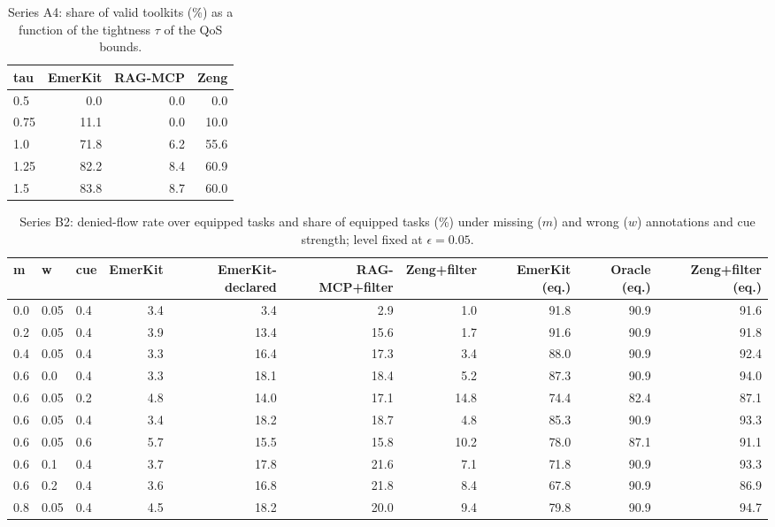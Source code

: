 \begin{table}[!ht]\centering\caption{Series A4: share of valid toolkits (\%) as a function of the tightness $\tau$ of the QoS bounds.}\label{tab:a4}\scriptsize
\begin{tabular}{lrrr}\toprule
tau & EmerKit & RAG-MCP & Zeng \\ \midrule
0.5 & 0.0 & 0.0 & 0.0 \\
0.75 & 11.1 & 0.0 & 10.0 \\
1.0 & 71.8 & 6.2 & 55.6 \\
1.25 & 82.2 & 8.4 & 60.9 \\
1.5 & 83.8 & 8.7 & 60.0 \\
\bottomrule\end{tabular}\end{table}
\begin{table}[!ht]\centering\caption{Series B2: denied-flow rate over equipped tasks and share of equipped tasks (\%) under missing ($m$) and wrong ($w$) annotations and cue strength; level fixed at $\epsilon=0.05$.}\label{tab:b2}\scriptsize
\begin{tabular}{lllrrrrrrr}\toprule
m & w & cue & EmerKit & EmerKit-declared & RAG-MCP+filter & Zeng+filter & EmerKit (eq.) & Oracle (eq.) & Zeng+filter (eq.) \\ \midrule
0.0 & 0.05 & 0.4 & 3.4 & 3.4 & 2.9 & 1.0 & 91.8 & 90.9 & 91.6 \\
0.2 & 0.05 & 0.4 & 3.9 & 13.4 & 15.6 & 1.7 & 91.6 & 90.9 & 91.8 \\
0.4 & 0.05 & 0.4 & 3.3 & 16.4 & 17.3 & 3.4 & 88.0 & 90.9 & 92.4 \\
0.6 & 0.0 & 0.4 & 3.3 & 18.1 & 18.4 & 5.2 & 87.3 & 90.9 & 94.0 \\
0.6 & 0.05 & 0.2 & 4.8 & 14.0 & 17.1 & 14.8 & 74.4 & 82.4 & 87.1 \\
0.6 & 0.05 & 0.4 & 3.4 & 18.2 & 18.7 & 4.8 & 85.3 & 90.9 & 93.3 \\
0.6 & 0.05 & 0.6 & 5.7 & 15.5 & 15.8 & 10.2 & 78.0 & 87.1 & 91.1 \\
0.6 & 0.1 & 0.4 & 3.7 & 17.8 & 21.6 & 7.1 & 71.8 & 90.9 & 93.3 \\
0.6 & 0.2 & 0.4 & 3.6 & 16.8 & 21.8 & 8.4 & 67.8 & 90.9 & 86.9 \\
0.8 & 0.05 & 0.4 & 4.5 & 18.2 & 20.0 & 9.4 & 79.8 & 90.9 & 94.7 \\
\bottomrule\end{tabular}\end{table}
